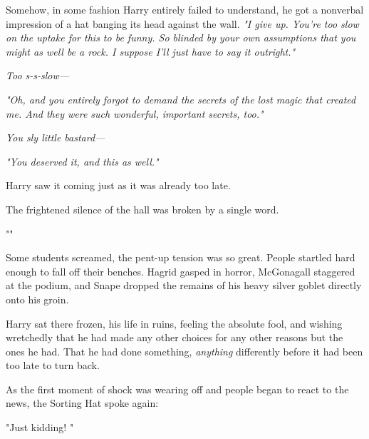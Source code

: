 Somehow, in some fashion Harry entirely failed to understand, he got a
nonverbal impression of a hat banging its head against the wall. \emph{"I give
up. You're too slow on the uptake for this to be funny. So blinded by your own
assumptions that you might as well be a rock. I suppose I'll just have to say
it outright."}

\emph{Too s-s-slow---}

\emph{"Oh, and you entirely forgot to demand the secrets of the lost magic that
created me. And they were such wonderful, important secrets, too."}

\emph{You sly little bastard---}

\emph{"You deserved it, and this as well."}

Harry saw it coming just as it was already too late.

The frightened silence of the hall was broken by a single word.

""

Some students screamed, the pent-up tension was so great. People startled hard
enough to fall off their benches. Hagrid gasped in horror, McGonagall staggered
at the podium, and Snape dropped the remains of his heavy silver goblet
directly onto his groin.

Harry sat there frozen, his life in ruins, feeling the absolute fool, and
wishing wretchedly that he had made any other choices for any other reasons but
the ones he had. That he had done something, \emph{anything} differently before
it had been too late to turn back.

As the first moment of shock was wearing off and people began to react to the
news, the Sorting Hat spoke again:

"Just kidding! "
